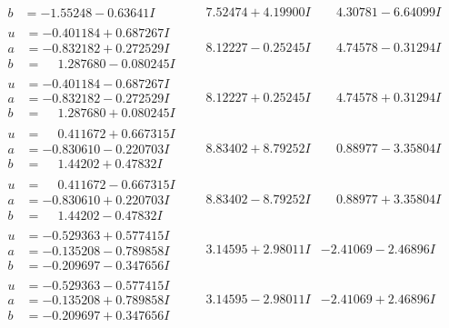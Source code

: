 \documentclass[1p]{elsarticle_modified}
\theoremstyle{definition}
\begin{document}
$$\begin{array}{c|c|c}
\begin{aligned}
b &= -1.55248 - 0.63641 I\end{aligned}
 & \phantom{-}7.52474 + 4.19900 I & \phantom{-}4.30781 - 6.64099 I \\ \hline\begin{aligned}
u &= -0.401184 + 0.687267 I \\
a &= -0.832182 + 0.272529 I \\
b &= \phantom{-}1.287680 - 0.080245 I\end{aligned}
 & \phantom{-}8.12227 - 0.25245 I & \phantom{-}4.74578 - 0.31294 I \\ \hline\begin{aligned}
u &= -0.401184 - 0.687267 I \\
a &= -0.832182 - 0.272529 I \\
b &= \phantom{-}1.287680 + 0.080245 I\end{aligned}
 & \phantom{-}8.12227 + 0.25245 I & \phantom{-}4.74578 + 0.31294 I \\ \hline\begin{aligned}
u &= \phantom{-}0.411672 + 0.667315 I \\
a &= -0.830610 - 0.220703 I \\
b &= \phantom{-}1.44202 + 0.47832 I\end{aligned}
 & \phantom{-}8.83402 + 8.79252 I & \phantom{-}0.88977 - 3.35804 I \\ \hline\begin{aligned}
u &= \phantom{-}0.411672 - 0.667315 I \\
a &= -0.830610 + 0.220703 I \\
b &= \phantom{-}1.44202 - 0.47832 I\end{aligned}
 & \phantom{-}8.83402 - 8.79252 I & \phantom{-}0.88977 + 3.35804 I \\ \hline\begin{aligned}
u &= -0.529363 + 0.577415 I \\
a &= -0.135208 - 0.789858 I \\
b &= -0.209697 - 0.347656 I\end{aligned}
 & \phantom{-}3.14595 + 2.98011 I & -2.41069 - 2.46896 I \\ \hline\begin{aligned}
u &= -0.529363 - 0.577415 I \\
a &= -0.135208 + 0.789858 I \\
b &= -0.209697 + 0.347656 I\end{aligned}
 & \phantom{-}3.14595 - 2.98011 I & -2.41069 + 2.46896 I \\ \hline\begin{aligned}

\end{aligned}
\end{array}$$
\end{document}
